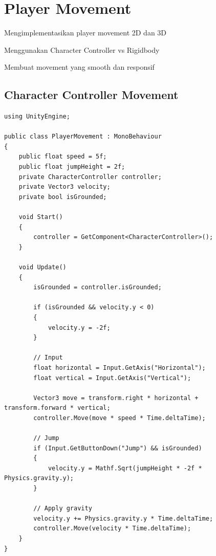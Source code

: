 
\section{Player Movement}

\begin{learningoutcomes}
\item Mengimplementasikan player movement 2D dan 3D
\item Menggunakan Character Controller vs Rigidbody
\item Membuat movement yang smooth dan responsif
\end{learningoutcomes}

\subsection{Character Controller Movement}

\begin{lstlisting}[language={[Sharp]C}]
using UnityEngine;

public class PlayerMovement : MonoBehaviour
{
    public float speed = 5f;
    public float jumpHeight = 2f;
    private CharacterController controller;
    private Vector3 velocity;
    private bool isGrounded;
    
    void Start()
    {
        controller = GetComponent<CharacterController>();
    }
    
    void Update()
    {
        isGrounded = controller.isGrounded;
        
        if (isGrounded && velocity.y < 0)
        {
            velocity.y = -2f;
        }
        
        // Input
        float horizontal = Input.GetAxis("Horizontal");
        float vertical = Input.GetAxis("Vertical");
        
        Vector3 move = transform.right * horizontal + transform.forward * vertical;
        controller.Move(move * speed * Time.deltaTime);
        
        // Jump
        if (Input.GetButtonDown("Jump") && isGrounded)
        {
            velocity.y = Mathf.Sqrt(jumpHeight * -2f * Physics.gravity.y);
        }
        
        // Apply gravity
        velocity.y += Physics.gravity.y * Time.deltaTime;
        controller.Move(velocity * Time.deltaTime);
    }
}
\end{lstlisting}

